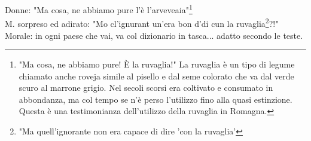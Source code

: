 \documentclass[10pt]{memoir} %
\begin{document}
Donne: "Ma cosa, ne abbiamo pure l'è l'arveveaia"\footnote{"Ma cosa, ne abbiamo pure! È la ruvaglia!" La ruvaglia è un tipo di legume chiamato anche roveja simile al pisello e dal seme colorato che va dal verde scuro al marrone grigio. Nel secoli scorsi era coltivato e consumato in abbondanza, ma col tempo se n'è perso l'utilizzo fino alla quasi estinzione. Questa è una testimonianza dell'utilizzo della ruvaglia in Romagna.}\\
M. \:\: sorpreso ed adirato: "Mo cl'ignurant un'era bon d'di cun la ruvaglia\footnote{"Ma quell'ignorante non era capace di dire 'con la ruvaglia'}?!"\\
Morale: in ogni paese che vai, va col dizionario in tasca... adatto secondo le teste.

\end{document}

